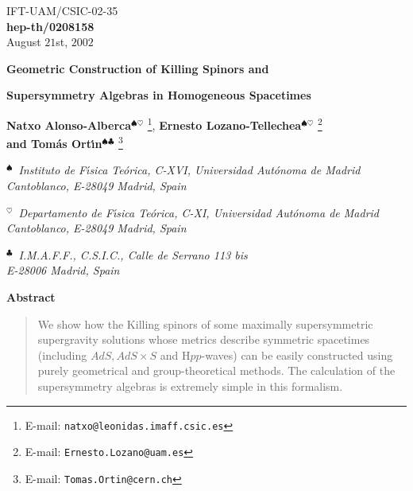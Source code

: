 \documentclass[12pt,a4paper]{article}
\begin{document}
\begin{flushright}
\small
IFT-UAM/CSIC-02-35\\
{\bf hep-th/0208158}\\
August $21$st, $2002$
\normalsize
\end{flushright}

\begin{center}


\vspace{2cm}

{\Large {\bf Geometric Construction of Killing Spinors and}}

\vspace{.5cm}

{\Large {\bf Supersymmetry Algebras in Homogeneous Spacetimes}}

\vspace{2cm}

{\bf\large Natxo Alonso-Alberca}${}^{\spadesuit\heartsuit}$
\footnote{E-mail: {\tt natxo@leonidas.imaff.csic.es}},
{\bf\large Ernesto Lozano-Tellechea}${}^{\spadesuit\heartsuit}$
\footnote{E-mail: {\tt Ernesto.Lozano@uam.es}}\\
{\bf\large and Tom{\'a}s Ort\'{\i}n}${}^{\spadesuit\clubsuit}$
\footnote{E-mail: {\tt Tomas.Ortin@cern.ch}}

\vspace{1cm}

${}^{\spadesuit}$\ {\it Instituto de F\'{\i}sica Te{\'o}rica, C-XVI,
Universidad Aut{\'o}noma de Madrid\\
Cantoblanco, E-28049 Madrid, Spain}

\vskip 0.2cm
${}^{\heartsuit}$\ {\it Departamento de F\'{\i}sica Te{\'o}rica, C-XI,
Universidad Aut{\'o}noma de Madrid\\
Cantoblanco, E-28049 Madrid, Spain}

\vskip 0.2cm
${}^{\clubsuit}$\ {\it I.M.A.F.F., C.S.I.C., 
Calle de Serrano 113 bis\\ 
E-28006 Madrid, Spain}
\vspace{.7cm}






{\bf Abstract}

\end{center}

\begin{quotation}

\small

We show how the Killing spinors of some maximally supersymmetric
supergravity solutions whose metrics describe symmetric spacetimes
(including $AdS,AdS\times S$ and H$pp$-waves) can be easily
constructed using purely geometrical and group-theoretical methods.
The calculation of the supersymmetry algebras is extremely simple in
this formalism.

\end{quotation}
\end{document}
